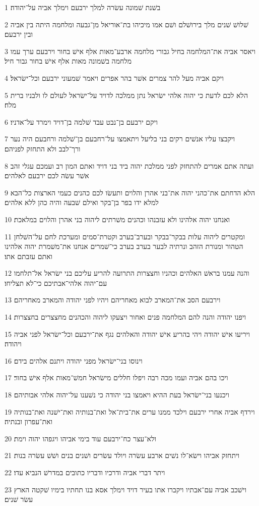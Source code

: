 \par 1 בשׁנת שׁמונה עשׂרה למלך ירבעם וימלך אביה על־יהודה׃
\par 2 שׁלושׁ שׁנים מלך בירושׁלם ושׁם אמו מיכיהו בת־אוריאל מן־גבעה ומלחמה היתה בין אביה ובין ירבעם׃
\par 3 ויאסר אביה את־המלחמה בחיל גבורי מלחמה ארבע־מאות אלף אישׁ בחור וירבעם ערך עמו מלחמה בשׁמונה מאות אלף אישׁ בחור גבור חיל׃
\par 4 ויקם אביה מעל להר צמרים אשׁר בהר אפרים ויאמר שׁמעוני ירבעם וכל־ישׂראל׃
\par 5 הלא לכם לדעת כי יהוה אלהי ישׂראל נתן ממלכה לדויד על־ישׂראל לעולם לו ולבניו ברית מלח׃
\par 6 ויקם ירבעם בן־נבט עבד שׁלמה בן־דויד וימרד על־אדניו׃
\par 7 ויקבצו עליו אנשׁים רקים בני בליעל ויתאמצו על־רחבעם בן־שׁלמה ורחבעם היה נער ורך־לבב ולא התחזק לפניהם׃
\par 8 ועתה אתם אמרים להתחזק לפני ממלכת יהוה ביד בני דויד ואתם המון רב ועמכם עגלי זהב אשׁר עשׂה לכם ירבעם לאלהים׃
\par 9 הלא הדחתם את־כהני יהוה את־בני אהרן והלוים ותעשׂו לכם כהנים כעמי הארצות כל־הבא למלא ידו בפר בן־בקר ואילם שׁבעה והיה כהן ללא אלהים׃
\par 10 ואנחנו יהוה אלהינו ולא עזבנהו וכהנים משׁרתים ליהוה בני אהרן והלוים במלאכת׃
\par 11 ומקטרים ליהוה עלות בבקר־בבקר ובערב־בערב וקטרת־סמים ומערכת לחם על־השׁלחן הטהור ומנורת הזהב ונרתיה לבער בערב בערב כי־שׁמרים אנחנו את־משׁמרת יהוה אלהינו ואתם עזבתם אתו׃
\par 12 והנה עמנו בראשׁ האלהים וכהניו וחצצרות התרועה להריע עליכם בני ישׂראל אל־תלחמו עם־יהוה אלהי־אבתיכם כי־לא תצליחו׃
\par 13 וירבעם הסב את־המארב לבוא מאחריהם ויהיו לפני יהודה והמארב מאחריהם׃
\par 14 ויפנו יהודה והנה להם המלחמה פנים ואחור ויצעקו ליהוה והכהנים מחצצרים בחצצרות׃
\par 15 ויריעו אישׁ יהודה ויהי בהריע אישׁ יהודה והאלהים נגף את־ירבעם וכל־ישׂראל לפני אביה ויהודה׃
\par 16 וינוסו בני־ישׂראל מפני יהודה ויתנם אלהים בידם׃
\par 17 ויכו בהם אביה ועמו מכה רבה ויפלו חללים מישׂראל חמשׁ־מאות אלף אישׁ בחור׃
\par 18 ויכנעו בני־ישׂראל בעת ההיא ויאמצו בני יהודה כי נשׁענו על־יהוה אלהי אבותיהם׃
\par 19 וירדף אביה אחרי ירבעם וילכד ממנו ערים את־בית־אל ואת־בנותיה ואת־ישׁנה ואת־בנותיה ואת־עפרון ובנתיה׃
\par 20 ולא־עצר כח־ירבעם עוד בימי אביהו ויגפהו יהוה וימת׃
\par 21 ויתחזק אביהו וישׂא־לו נשׁים ארבע עשׂרה ויולד עשׂרים ושׁנים בנים ושׁשׁ עשׂרה בנות׃
\par 22 ויתר דברי אביה ודרכיו ודבריו כתובים במדרשׁ הנביא עדו׃
\par 23 וישׁכב אביה עם־אבתיו ויקברו אתו בעיר דויד וימלך אסא בנו תחתיו בימיו שׁקטה הארץ עשׂר שׁנים׃

